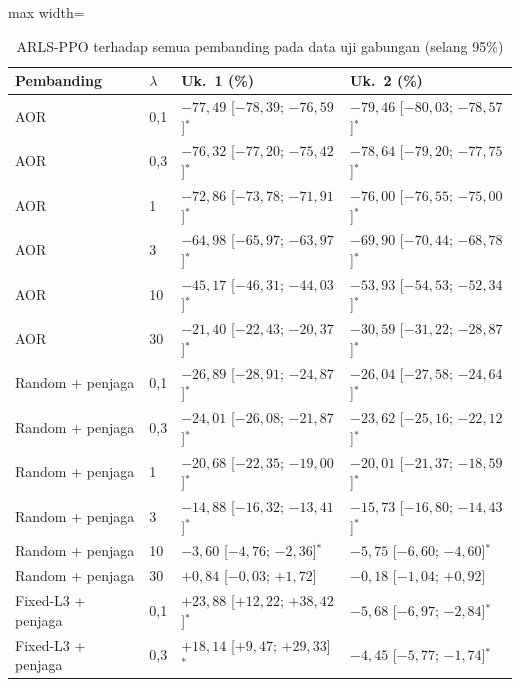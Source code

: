 \begin{table}[htbp]
\caption{ARLS-PPO terhadap semua pembanding pada data uji gabungan (selang 95\%)}
\label{tab:uji-gabungan}
\centering\footnotesize
\setlength{\tabcolsep}{4pt}
\begin{adjustbox}{max width=\textwidth}
\begin{tabular}{llll}
\toprule
Pembanding & $\lambda$ & Uk.~1 (\%) & Uk.~2 (\%) \\
\midrule
AOR & 0{,}1 & $-77{,}49$ [$-78{,}39$; $-76{,}59$]$^{*}$ & $-79{,}46$ [$-80{,}03$; $-78{,}57$]$^{*}$ \\
AOR & 0{,}3 & $-76{,}32$ [$-77{,}20$; $-75{,}42$]$^{*}$ & $-78{,}64$ [$-79{,}20$; $-77{,}75$]$^{*}$ \\
AOR & 1 & $-72{,}86$ [$-73{,}78$; $-71{,}91$]$^{*}$ & $-76{,}00$ [$-76{,}55$; $-75{,}00$]$^{*}$ \\
AOR & 3 & $-64{,}98$ [$-65{,}97$; $-63{,}97$]$^{*}$ & $-69{,}90$ [$-70{,}44$; $-68{,}78$]$^{*}$ \\
AOR & 10 & $-45{,}17$ [$-46{,}31$; $-44{,}03$]$^{*}$ & $-53{,}93$ [$-54{,}53$; $-52{,}34$]$^{*}$ \\
AOR & 30 & $-21{,}40$ [$-22{,}43$; $-20{,}37$]$^{*}$ & $-30{,}59$ [$-31{,}22$; $-28{,}87$]$^{*}$ \\
\addlinespace
Random + penjaga & 0{,}1 & $-26{,}89$ [$-28{,}91$; $-24{,}87$]$^{*}$ & $-26{,}04$ [$-27{,}58$; $-24{,}64$]$^{*}$ \\
Random + penjaga & 0{,}3 & $-24{,}01$ [$-26{,}08$; $-21{,}87$]$^{*}$ & $-23{,}62$ [$-25{,}16$; $-22{,}12$]$^{*}$ \\
Random + penjaga & 1 & $-20{,}68$ [$-22{,}35$; $-19{,}00$]$^{*}$ & $-20{,}01$ [$-21{,}37$; $-18{,}59$]$^{*}$ \\
Random + penjaga & 3 & $-14{,}88$ [$-16{,}32$; $-13{,}41$]$^{*}$ & $-15{,}73$ [$-16{,}80$; $-14{,}43$]$^{*}$ \\
Random + penjaga & 10 & $-3{,}60$ [$-4{,}76$; $-2{,}36$]$^{*}$ & $-5{,}75$ [$-6{,}60$; $-4{,}60$]$^{*}$ \\
Random + penjaga & 30 & $+0{,}84$ [$-0{,}03$; $+1{,}72$] & $-0{,}18$ [$-1{,}04$; $+0{,}92$] \\
\addlinespace
Fixed-L3 + penjaga & 0{,}1 & $+23{,}88$ [$+12{,}22$; $+38{,}42$]$^{*}$ & $-5{,}68$ [$-6{,}97$; $-2{,}84$]$^{*}$ \\
Fixed-L3 + penjaga & 0{,}3 & $+18{,}14$ [$+9{,}47$; $+29{,}33$]$^{*}$ & $-4{,}45$ [$-5{,}77$; $-1{,}74$]$^{*}$ \\

\end{tabular}
\end{adjustbox}
\end{table}
